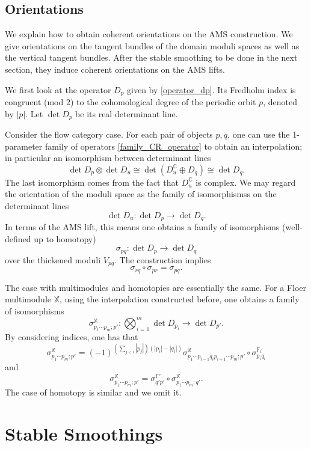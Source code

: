 \documentclass[reqno, 10pt]{amsart}
\numberwithin{equation}{section}
\numberwithin{equation}{section}
\theoremstyle{definition}
\theoremstyle{remark}
\newcommand{\beqn}{\begin{equation*}}
\newcommand{\eeqn}{\end{equation*}}
\newcommand{\mb}{\mathbb}
\begin{document}
\subsection{Orientations}\label{subsection165}

We explain how to obtain coherent orientations on the AMS construction. We give orientations on the tangent bundles of the domain moduli spaces as well as the vertical tangent bundles. After the stable smoothing to be done in the next section, they induce coherent orientations on the AMS lifts.

We first look at the operator $D_p$ given by \eqref{operator_dp}. Its Fredholm index is congruent (mod $2$) to the cohomological degree of the periodic orbit $p$, denoted by $|p|$. Let $\det D_p$ be its real determinant line. 

Consider the flow category case. For each pair of objects $p, q$, one can use the 1-parameter family of operators \eqref{family_CR_operator} to obtain an interpolation; in particular an isomorphism between determinant lines
\beqn
\det D_p \otimes \det D_u \cong \det (D_u^{\mb C} \oplus D_q) \cong \det D_q. 
\eeqn
The last isomorphism comes from the fact that $D_u^{\mb C}$ is complex. We may regard the orientation of the moduli space as the family of isomorphismss on the determinant lines
\beqn
\det D_u: \det D_p \to \det D_q.
\eeqn
In terms of the AMS lift, this means one obtains a family of isomorphisms (well-defined up to homotopy) 
\beqn
\sigma_{pq}: \det D_p \to \det D_q
\eeqn
over the thickened moduli $V_{pq}$. The construction implies
\beqn
\sigma_{rq} \circ \sigma_{pr} = \sigma_{pq}.
\eeqn

The case with multimodules and homotopies are essentially the same. For a Floer multimodule ${\mb X}$, using the interpolation constructed before, one obtains a family of isomorphisms
\beqn
\sigma_{p_1 \cdots p_m; p'}^{\mb X}: \bigotimes_{i=1}^m \det D_{p_i} \to \det D_{p'}.
\eeqn
By considering indices, one has that
\beqn
\sigma_{p_1 \cdots p_m; p'}^{\mb X} = (-1)^{( \sum_{j<i}|p_j|) (|p_i|- |q_i|)} \sigma_{p_1 \cdots p_{i-1} q_i p_{i+1} \cdots p_m; p'}^{\mb X} \circ \sigma_{p_i q_i}^{{\mb F}_i} 
\eeqn
and
\beqn
\sigma_{p_1 \cdots p_m; p'}^{\mb X} = \sigma_{q'p'}^{{\mb F}'}\circ \sigma_{p_1 \cdots p_m;q'}^{\mb X}.
\eeqn
The case of homotopy is similar and we omit it. 









\section{Stable Smoothings}
\end{document}
